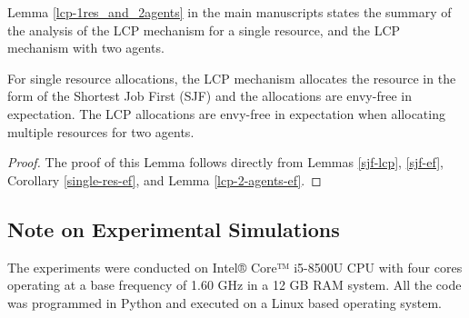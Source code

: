 \documentclass[letterpaper]{article} %
\theoremstyle{definition}
\newenvironment{customlemma}[1]
  {\renewcommand\theinnercustomlemma{#1}\innercustomlemma}
  {\endinnercustomlemma}
\begin{document}
 Lemma \ref{lcp-1res_and_2agents} in the main manuscripts states the summary of the analysis of the LCP mechanism for a single resource, and the LCP mechanism with two agents.
 
\begin{customlemma} {6}
For single resource allocations, the LCP mechanism allocates the resource in the form of the Shortest Job First (SJF) and the allocations are envy-free in expectation. The LCP allocations are envy-free in expectation when allocating multiple resources for two agents.
\end{customlemma}

\begin{proof}
The proof of this Lemma follows directly from Lemmas \ref{sjf-lcp}, \ref{sjf-ef}, Corollary \ref{single-res-ef}, and Lemma \ref{lcp-2-agents-ef}.
\end{proof}


\subsection{Note on Experimental Simulations}

The experiments were conducted on Intel® Core™ i5-8500U CPU with four cores operating at a base frequency of 1.60 GHz in a 12 GB RAM system. All the code was programmed in Python and executed on a Linux based operating system. 
\end{document}
